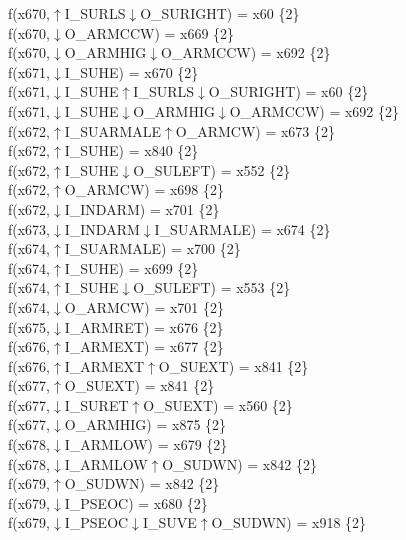 f(x670,$\uparrow$I\_SURLS$\downarrow$O\_SURIGHT) = x60 \{2\} \\  
f(x670,$\downarrow$O\_ARMCCW) = x669 \{2\} \\  
f(x670,$\downarrow$O\_ARMHIG$\downarrow$O\_ARMCCW) = x692 \{2\} \\  
f(x671,$\downarrow$I\_SUHE) = x670 \{2\} \\  
f(x671,$\downarrow$I\_SUHE$\uparrow$I\_SURLS$\downarrow$O\_SURIGHT) = x60 \{2\} \\  
f(x671,$\downarrow$I\_SUHE$\downarrow$O\_ARMHIG$\downarrow$O\_ARMCCW) = x692 \{2\} \\  
f(x672,$\uparrow$I\_SUARMALE$\uparrow$O\_ARMCW) = x673 \{2\} \\  
f(x672,$\uparrow$I\_SUHE) = x840 \{2\} \\  
f(x672,$\uparrow$I\_SUHE$\downarrow$O\_SULEFT) = x552 \{2\} \\  
f(x672,$\uparrow$O\_ARMCW) = x698 \{2\} \\  
f(x672,$\downarrow$I\_INDARM) = x701 \{2\} \\  
f(x673,$\downarrow$I\_INDARM$\downarrow$I\_SUARMALE) = x674 \{2\} \\  
f(x674,$\uparrow$I\_SUARMALE) = x700 \{2\} \\  
f(x674,$\uparrow$I\_SUHE) = x699 \{2\} \\  
f(x674,$\uparrow$I\_SUHE$\downarrow$O\_SULEFT) = x553 \{2\} \\  
f(x674,$\downarrow$O\_ARMCW) = x701 \{2\} \\  
f(x675,$\downarrow$I\_ARMRET) = x676 \{2\} \\  
f(x676,$\uparrow$I\_ARMEXT) = x677 \{2\} \\  
f(x676,$\uparrow$I\_ARMEXT$\uparrow$O\_SUEXT) = x841 \{2\} \\  
f(x677,$\uparrow$O\_SUEXT) = x841 \{2\} \\  
f(x677,$\downarrow$I\_SURET$\uparrow$O\_SUEXT) = x560 \{2\} \\  
f(x677,$\downarrow$O\_ARMHIG) = x875 \{2\} \\  
f(x678,$\downarrow$I\_ARMLOW) = x679 \{2\} \\  
f(x678,$\downarrow$I\_ARMLOW$\uparrow$O\_SUDWN) = x842 \{2\} \\  
f(x679,$\uparrow$O\_SUDWN) = x842 \{2\} \\  
f(x679,$\downarrow$I\_PSEOC) = x680 \{2\} \\  
f(x679,$\downarrow$I\_PSEOC$\downarrow$I\_SUVE$\uparrow$O\_SUDWN) = x918 \{2\} \\  
